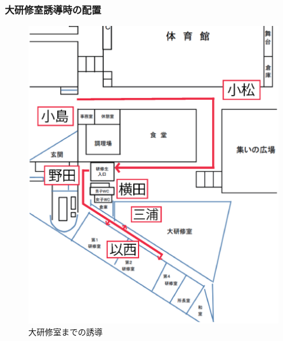 \subsubsection{大研修室誘導時の配置}
\begin{figure}[htbp]
  \begin{center}
   \includegraphics[scale=0.4]{./03/yuudou.eps}
  \end{center}
  \caption{大研修室までの誘導}
  \label{fig:hare}
\end{figure}


